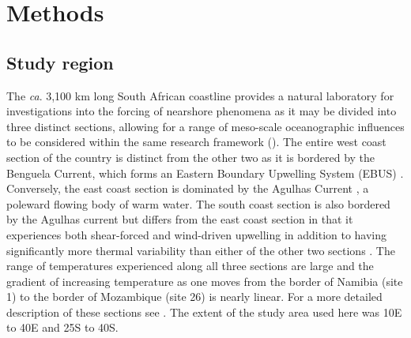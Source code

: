 \documentclass[a4paper,10pt,review]{elsarticle}
\begin{document}
\section{Methods}
\subsection{Study region}
The \emph{ca}. 3,100 km long South African coastline provides a natural laboratory for investigations into the forcing of nearshore phenomena as it may be divided into three distinct sections, allowing for a range of meso-scale oceanographic influences to be considered within the same research framework (). The entire west coast section of the country is distinct from the other two as it is bordered by the Benguela Current, which forms an Eastern Boundary Upwelling System (EBUS) \citep{Hutchings2009}. Conversely, the east coast section is dominated by the Agulhas Current \citep{Luning1990}, a poleward flowing body of warm water. The south coast section is also bordered by the Agulhas current but differs from the east coast section in that it experiences both shear-forced and wind-driven upwelling \citep{Lutjeharms2000a} in addition to having significantly more thermal variability than either of the other two sections \citep{Schlegel2017}. The range of temperatures experienced along all three sections are large and the gradient of increasing temperature as one moves from the border of Namibia (site 1) to the border of Mozambique (site 26) is nearly linear. For a more detailed description of these sections see \citet{Smit2013}. The extent of the study area used here was 10\degree E to 40\degree E and 25\degree S to 40\degree S.
\end{document}
